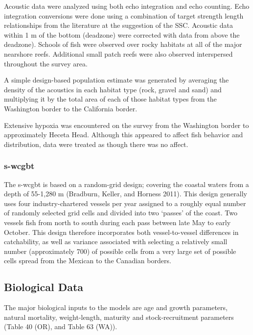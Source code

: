 \documentclass[11pt,
  english,
  letterpaper,
]{article}
\begin{document}
Acoustic data were analyzed using both echo integration and echo counting. Echo integration conversions were done using a combination of target strength length relationships from the literature at the suggestion of the SSC. Acoustic data within 1 m of the bottom (deadzone) were corrected with data from above the deadzone). Schools of fish were observed over rocky habitats at all of the major nearshore reefs. Additional small patch reefs were also observed interspersed throughout the survey area.

A simple design-based population estimate was generated by averaging the density of the acoustics in each habitat type (rock, gravel and sand) and multiplying it by the total area of each of those habitat types from the Washington border to the California border.

Extensive hypoxia was encountered on the survey from the Washington border to approximately Heceta Head. Although this appeared to affect fish behavior and distribution, data were treated as though there was no affect.

\hypertarget{section}{%
\subsubsection{\texorpdfstring{\acrlong{s-wcgbt}}{}}\label{section}}

The \Gls{s-wcgbt} is based on a random-grid design; covering the coastal waters from a depth of 55-1,280 m (Bradburn, Keller, and Horness 2011). This design generally uses four industry-chartered vessels per year assigned to a roughly equal number of randomly selected grid cells and divided into two `passes' of the coast. Two vessels fish from north to south during each pass between late May to early October. This design therefore incorporates both vessel-to-vessel differences in catchability, as well as variance associated with selecting a relatively small number (approximately 700) of possible cells from a very large set of possible cells spread from the Mexican to the Canadian borders.

\hypertarget{biological-data}{%
\subsection{Biological Data}\label{biological-data}}

The major biological inputs to the models are age and growth parameters, natural mortality, weight-length, maturity and stock-recruitment parameters (Table 40 (OR), and Table 63 (WA)).
\end{document}
